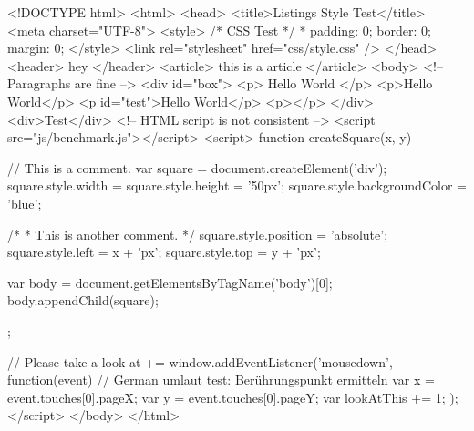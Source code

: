 \documentclass[a4paper, 11pt]{report}
\begin{document}
\begin{htmlcssjs}
    <!DOCTYPE html>
    <html>
      <head>
        <title>Listings Style Test</title>
        <meta charset="UTF-8">
        <style>
          /* CSS Test */
          * {
            padding: 0;
            border: 0;
            margin: 0;
          }
        </style>
        <link rel="stylesheet" href="css/style.css" />
      </head>
      <header> hey </header>
      <article> this is a article </article>
      <body>
        <!-- Paragraphs are fine -->
        <div id="box">			
                <p>
                  Hello World
                </p>
          <p>Hello World</p>
          <p id="test">Hello World</p>
                <p></p>
        </div>
        <div>Test</div>
        <!-- HTML script is not consistent -->
        <script src="js/benchmark.js"></script>
        <script>
          function createSquare(x, y) {
            // This is a comment.
            var square = document.createElement('div');
            square.style.width = square.style.height = '50px';
            square.style.backgroundColor = 'blue';
            
            /*
             * This is another comment.
             */
            square.style.position = 'absolute';
            square.style.left = x + 'px'; 
            square.style.top = y + 'px';
            
            var body = document.getElementsByTagName('body')[0];
            body.appendChild(square);
          };
          
          // Please take a look at +=
          window.addEventListener('mousedown', function(event) {
            // German umlaut test: Berührungspunkt ermitteln
            var x = event.touches[0].pageX;
            var y = event.touches[0].pageY;
            var lookAtThis += 1;
          });
        </script>
      </body>
    </html>
\end{htmlcssjs}
\end{document}
